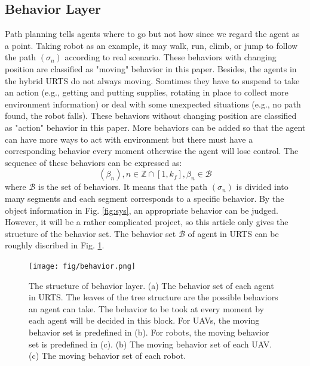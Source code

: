 \documentclass{ieeeaccess}
\begin{document}
\subsection{Behavior Layer}
Path planning tells agents where to go but not how since we regard the agent as a point. Taking robot as an example, it may walk, run, climb, or jump to follow the path $(\sigma_n)$ according to real scenario. These behaviors with changing position are classified as "moving" behavior in this paper. Besides, the agents in the hybrid URTS do not always moving. Somtimes they have to suspend to take an action (e.g., getting and putting supplies, rotating in place to collect more environment information) or deal with some unexpected situations (e.g., no path found, the robot falls). These behaviors without changing position are classified as "action" behavior in this paper. More behaviors can be added so that the agent can have more ways to act with environment but there must have a corresponding behavior every moment otherwise the agent will lose control. The sequence of these behaviors can be expressed as:
\begin{equation}
    (\beta_n), n\in\mathbb{Z}\cap[1,k_f], \beta_n\in\mathcal{B}
\end{equation}
where $\mathcal{B}$ is the set of behaviors. It means that the path $(\sigma_n)$ is divided into many segments and each segment corresponds to a specific behavior. By the object information in Fig. \ref{fig:sys}, an appropriate behavior can be judged. However, it will be a rather complicated project, so this article only gives the structure of the behavior set. The behavior set $\mathcal{B}$ of agent in URTS can be roughly discribed in Fig. \ref{fig:behavior}.

\begin{figure}[htbp]
    \centering
    \texttt{[image: fig/behavior.png]}\caption{The structure of behavior layer. (a) The behavior set of each agent in URTS. The leaves of the tree structure are the possible behaviors an agent can take. The behavior to be took at every moment by each agent will be decided in this block. For UAVs, the moving behavior set is predefined in (b). For robots, the moving behavior set is predefined in (c). (b) The moving behavior set of each UAV. (c) The moving behavior set of each robot.}%
    \label{fig:behavior}
\end{figure}
\end{document}
